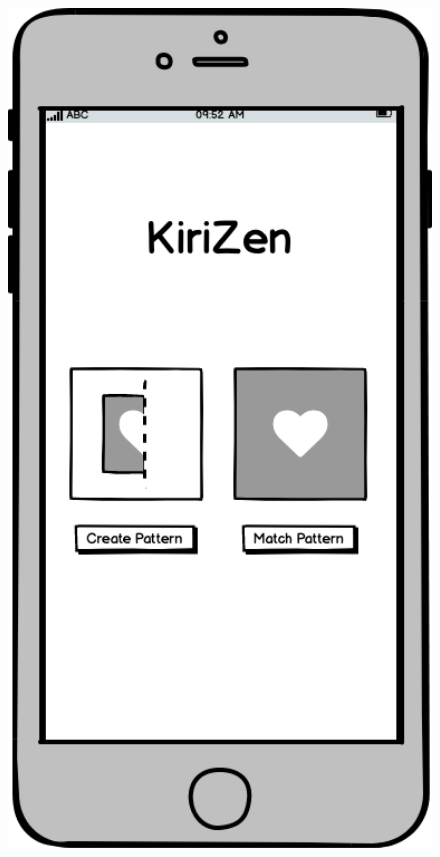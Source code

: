 \documentclass[11pt]{article}
\begin{document}
\clearpage
             \begin{figure}
                \begin{minipage}[c]{0.35\textwidth}
                \includegraphics[width=1\textwidth]{Images/Prototype/prototypeHomeScreen.png}
                \end{minipage}\hfill

\end{figure}
\end{document}
